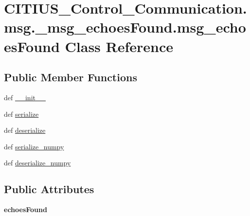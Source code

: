 \hypertarget{class_c_i_t_i_u_s___control___communication_1_1msg_1_1__msg__echoes_found_1_1msg__echoes_found}{\section{\-C\-I\-T\-I\-U\-S\-\_\-\-Control\-\_\-\-Communication.\-msg.\-\_\-msg\-\_\-echoes\-Found.\-msg\-\_\-echoes\-Found \-Class \-Reference}
\label{class_c_i_t_i_u_s___control___communication_1_1msg_1_1__msg__echoes_found_1_1msg__echoes_found}
}
\subsection*{\-Public \-Member \-Functions}
\begin{DoxyCompactItemize}
\item 
def \hyperlink{class_c_i_t_i_u_s___control___communication_1_1msg_1_1__msg__echoes_found_1_1msg__echoes_found_ab18b4346cf6e77c30cf641d42f4c50fa}{\-\_\-\-\_\-init\-\_\-\-\_\-}
\item 
def \hyperlink{class_c_i_t_i_u_s___control___communication_1_1msg_1_1__msg__echoes_found_1_1msg__echoes_found_ab101654d6bffdce557777ec12513e628}{serialize}
\item 
def \hyperlink{class_c_i_t_i_u_s___control___communication_1_1msg_1_1__msg__echoes_found_1_1msg__echoes_found_aac3a1bfee32e078ff620986d0675b0ed}{deserialize}
\item 
def \hyperlink{class_c_i_t_i_u_s___control___communication_1_1msg_1_1__msg__echoes_found_1_1msg__echoes_found_ac309c0748a29b7655a6f4c7141069c70}{serialize\-\_\-numpy}
\item 
def \hyperlink{class_c_i_t_i_u_s___control___communication_1_1msg_1_1__msg__echoes_found_1_1msg__echoes_found_a68bdf417bc2426562abb01ae26be4002}{deserialize\-\_\-numpy}
\end{DoxyCompactItemize}
\subsection*{\-Public \-Attributes}
\begin{DoxyCompactItemize}
\item 
\hypertarget{class_c_i_t_i_u_s___control___communication_1_1msg_1_1__msg__echoes_found_1_1msg__echoes_found_a9c9e7250d4b1024760b439d4183ecc09}{{\bfseries echoes\-Found}}\label{class_c_i_t_i_u_s___control___communication_1_1msg_1_1__msg__echoes_found_1_1msg__echoes_found_a9c9e7250d4b1024760b439d4183ecc09}

\end{DoxyCompactItemize}
